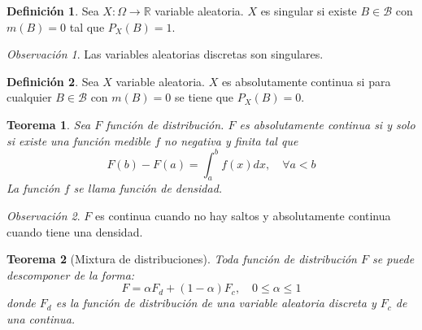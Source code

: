 \documentclass{report}
\newtheorem{theorem}{Teorema}[chapter]
\theoremstyle{remark}
\newtheorem*{remark}{Observación}
\theoremstyle{remark}
\theoremstyle{remark}
\theoremstyle{definition}
\newtheorem{definition}{Definición}[chapter]
\theoremstyle{definition}
\theoremstyle{definition}
\theoremstyle{definition}
\begin{document}
\begin{definition}
    Sea $X: \Omega \to \mathbb{R}$ variable aleatoria.
    $X$ es singular si existe $B \in \mathcal{B}$ con $m(B) = 0$ tal que $P_X(B) = 1$.
\end{definition}

\begin{remark}
    Las variables aleatorias discretas son singulares.
\end{remark}

\begin{definition}
    Sea $X$ variable aleatoria.
    $X$ es absolutamente continua si para cualquier $B \in \mathcal{B}$ con $m(B) = 0$ se tiene que $P_X(B) = 0$.
\end{definition}

\begin{theorem}
    Sea $F$ función de distribución.
    $F$ es absolutamente continua si y solo si existe una función medible $f$ no negativa y finita tal que
    $$F(b) - F(a) = \int_a^b f(x) dx, \quad \forall a < b$$
    La función $f$ se llama función de densidad.
\end{theorem}

\begin{remark}
    $F$ es continua cuando no hay saltos y absolutamente continua cuando tiene una densidad.
\end{remark}

\begin{theorem}[Mixtura de distribuciones]
    Toda función de distribución $F$ se puede descomponer de la forma:
    $$F = \alpha F_d + (1-\alpha)F_c, \quad 0 \leq \alpha \leq 1$$
    donde $F_d$ es la función de distribución de una variable aleatoria discreta y $F_c$ de una continua.
\end{theorem}
\end{document}
